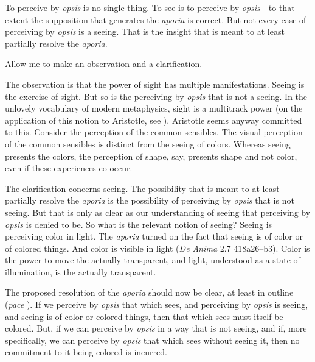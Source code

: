 
To perceive by \emph{opsis} is no single thing. To see is to perceive by \emph{opsis}—to that extent the supposition that generates the \emph{aporia} is correct. But not every case of perceiving by \emph{opsis} is a seeing. That is the insight that is meant to at least partially resolve the \emph{aporia}.

Allow me to make an observation and a clarification.

The observation is that the power of sight has multiple manifestations. Seeing is the exercise of sight. But so is the perceiving by \emph{opsis} that is not a seeing. In the unlovely vocabulary of modern metaphysics, sight is a multitrack power (on the application of this notion to Aristotle, see \citealt[3.1.2]{Marmodoro:2014br}). Aristotle seems anyway committed to this. Consider the perception of the common sensibles. The visual perception of the common sensibles is distinct from the seeing of colors. Whereas seeing presents the colors, the perception of shape, say, presents shape and not color, even if these experiences co-occur.

The clarification concerns seeing. The possibility that is meant to at least partially resolve the \emph{aporia} is the possibility of perceiving by \emph{opsis} that is not seeing. But that is only as clear as our understanding of seeing that perceiving by \emph{opsis} is denied to be. So what is the relevant notion of seeing? Seeing is perceiving color in light. The \emph{aporia} turned on the fact that seeing is of color or of colored things. And color is visible in light (\emph{De Anima} 2.7 418a26–b3). Color is the power to move the actually transparent, and light, understood as a state of illumination, is the actually transparent.


The proposed resolution of the \emph{aporia} should now be clear, at least in outline (\emph{pace} \citealt[122]{Hamlyn:2002ys}). If we perceive by \emph{opsis} that which sees, and perceiving by \emph{opsis} is seeing, and seeing is of color or colored things, then that which sees must itself be colored. But, if we can perceive by \emph{opsis} in a way that is not seeing, and if, more specifically, we can perceive by \emph{opsis} that which sees without seeing it, then no commitment to it being colored is incurred.

